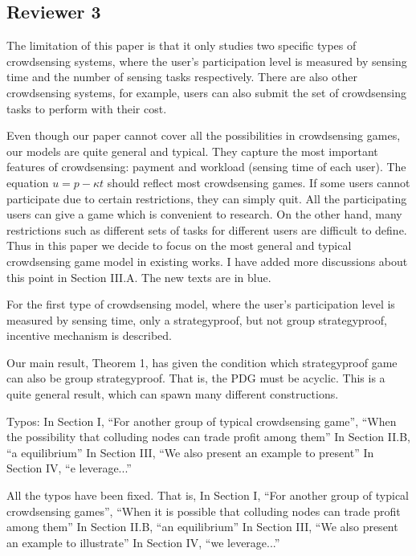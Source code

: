 \documentclass[a4paper,11pt]{exam}
\begin{document}
\begin{questions}
\section{Reviewer 3}
\question The limitation of this paper is that it only studies two specific types of crowdsensing systems, where the user's participation level is measured by sensing time and the number of sensing tasks respectively. There are also other crowdsensing systems, for example, users can also submit the set of crowdsensing tasks to perform with their cost.
\begin{solution}
Even though our paper cannot cover all the possibilities in crowdsensing games, our models are quite general and typical. They capture the most important features of crowdsensing: payment and workload (sensing time of each user). The equation $u = p - \kappa t$ should reflect most crowdsensing games. If some users cannot participate due to certain restrictions, they can simply quit. All the participating users can give a game which is convenient to research. On the other hand, many restrictions such as different sets of tasks for different users are difficult to define. Thus in this paper we decide to focus on the most general and typical crowdsensing game model in existing works. 
I have added more discussions about this point in Section III.A. The new texts are in blue.
\end{solution}

\question For the first type of crowdsensing model, where the user's participation level is measured by sensing time, only a strategyproof, but not group strategyproof, incentive mechanism is described.
\begin{solution}
Our main result, Theorem 1, has given the condition which strategyproof game can also be group strategyproof. That is, the PDG must be acyclic. This is a quite general result, which can spawn many different constructions.
\end{solution}

\question Typos: 
In Section I, ``For another group of typical crowdsensing game'', ``When the possibility that colluding nodes can trade profit among them''
In Section II.B, ``a equilibrium''
In Section III, ``We also present an example to present''
In Section IV, ``e leverage...''
\begin{solution}
All the typos have been fixed. That is, 
In Section I, ``For another group of typical crowdsensing games'', ``When it is possible that colluding nodes can trade profit among them''
In Section II.B, ``an equilibrium''
In Section III, ``We also present an example to illustrate''
In Section IV, ``we leverage...''
\end{solution}


\end{questions}
\end{document}
